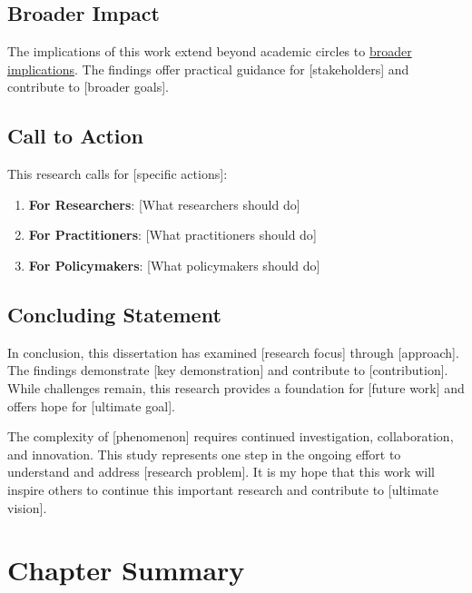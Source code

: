 \documentclass[
  12pt,
  letterpaper,
  12pt,
  letterpaper,
  oneside]{report}
\providecommand{\tightlist}{%
  \setlength{\itemsep}{0pt}\setlength{\parskip}{0pt}}
\begin{document}
\subsection{Broader Impact}\label{broader-impact}

The implications of this work extend beyond academic circles to
\hyperref[broader-implications]{broader implications}. The findings
offer practical guidance for {[}stakeholders{]} and contribute to
{[}broader goals{]}.

\subsection{Call to Action}\label{call-to-action}

This research calls for {[}specific actions{]}:

\begin{enumerate}
\def\labelenumi{\arabic{enumi}.}
\tightlist
\item
  \textbf{For Researchers}: {[}What researchers should do{]}
\item
  \textbf{For Practitioners}: {[}What practitioners should do{]}
\item
  \textbf{For Policymakers}: {[}What policymakers should do{]}
\end{enumerate}

\subsection{Concluding Statement}\label{concluding-statement}

In conclusion, this dissertation has examined {[}research focus{]}
through {[}approach{]}. The findings demonstrate {[}key demonstration{]}
and contribute to {[}contribution{]}. While challenges remain, this
research provides a foundation for {[}future work{]} and offers hope for
{[}ultimate goal{]}.

The complexity of {[}phenomenon{]} requires continued investigation,
collaboration, and innovation. This study represents one step in the
ongoing effort to understand and address {[}research problem{]}. It is
my hope that this work will inspire others to continue this important
research and contribute to {[}ultimate vision{]}.

\section{Chapter Summary}\label{chapter-summary-4}
\end{document}
